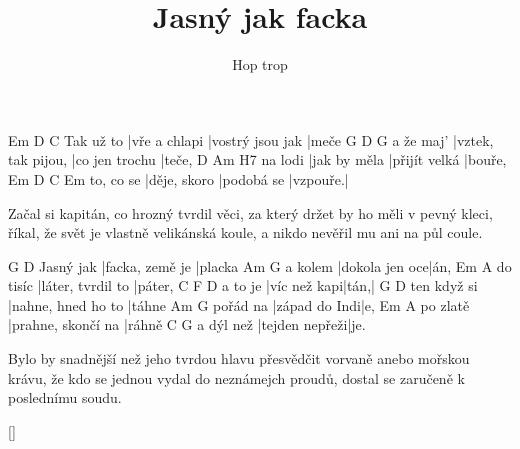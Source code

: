 \documentclass{song}
\title{Jasný jak facka}
\author{Hop trop}
\begin{document}
\strophe
          Em            D                C
Tak už to |vře a chlapi |vostrý jsou jak |meče
          G                  D              G
a že maj' |vztek, tak pijou, |co jen trochu |teče,
        D            Am            H7
na lodi |jak by měla |přijít velká |bouře,
          Em           D          C        Em
to, co se |děje, skoro |podobá se |vzpouře.|
\endstrophe

\strophe*
Začal si kapitán, co hrozný tvrdil věci,
za který držet by ho měli v pevný kleci,
říkal, že svět je vlastně velikánská koule,
a nikdo nevěřil mu ani na půl coule.
\endstrophe

          G               D
Jasný jak |facka, země je |placka
        Am             G
a kolem |dokola jen oce|án,
         Em                A
do tisíc |láter, tvrdil to |páter,
        C            F    D
a to je |víc než kapi|tán,|
            G                  D
ten když si |nahne, hned ho to |táhne
         Am            G
pořád na |západ do Indi|e,
         Em                 A
po zlatě |prahne, skončí na |ráhně
          C              G
a dýl než |tejden nepřeži|je.
\endstrophe

\strophe*
Bylo by snadnější než jeho tvrdou hlavu
přesvědčit vorvaně anebo mořskou krávu,
že kdo se jednou vydal do neznámejch proudů,
dostal se zaručeně k poslednímu soudu.
\endstrophe

\ref{}
\end{document}
